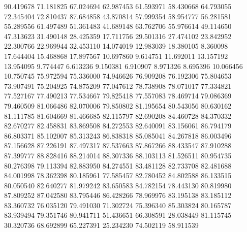 90.419678
71.181825
67.024694
62.987453
61.593971
58.430668
64.793055
72.345404
72.810437
87.684858
43.870814
57.999354
58.954777
56.281581
55.289556
61.497489
51.361483
41.689148
63.762706
55.976614
49.114650
47.313623
31.490148
28.425359
17.711756
29.501316
27.474102
23.842952
22.300766
22.969944
32.453110
14.074019
12.983039
18.380105
8.360098
17.644404
15.468868
17.897567
10.697860
9.614751
11.692011
13.157192
13.954095
9.774447
6.613236
9.150381
6.910907
8.971326
8.695396
10.066456
10.750745
75.972594
75.336000
74.946626
76.909208
76.192306
75.804653
73.907491
75.204925
74.875209
77.047612
78.738908
78.071017
77.334821
77.527167
77.490213
77.534667
79.825418
77.557083
78.469714
79.086369
79.460509
81.066486
82.070006
79.850802
81.195654
80.543056
80.630162
81.111785
81.604669
81.466685
82.115797
82.690208
84.460728
84.370332
82.670277
82.458831
83.869508
84.272553
82.640091
83.156061
86.794179
86.803371
85.102007
85.313243
86.838318
85.085041
84.267818
86.003496
87.156628
87.226191
87.497317
87.537663
87.867266
88.433547
87.910288
87.399777
88.828416
88.214014
88.307336
88.103113
81.526511
80.954735
80.276398
79.113394
82.883950
84.274551
83.481128
82.733708
82.481688
84.001998
78.362398
80.185961
77.585457
82.780452
84.802588
86.133515
80.050540
82.640277
81.979242
83.650583
84.782154
78.443130
80.819980
87.809252
87.042580
83.795446
86.428266
78.969976
83.195138
83.185112
83.360732
76.035120
79.491030
71.302724
75.396340
85.303824
80.165787
83.939494
79.351746
80.941711
51.436651
66.308591
28.038449
81.115745
30.320736
68.692899
65.227391
25.234230
74.502119
58.911539
